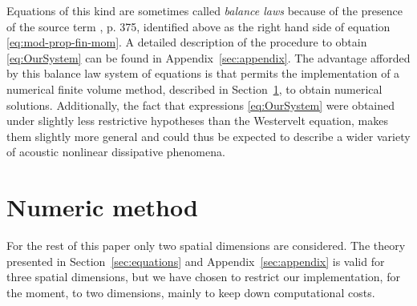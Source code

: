 Equations of this kind are sometimes called {\em balance laws} because of the presence of the source term \citep{leveque-book-fv}, p. 375, identified above as the right hand side of equation \eqref{eq:mod-prop-fin-mom}. 
A detailed description of the procedure to obtain \eqref{eq:OurSystem} can be found in Appendix~\ref{sec:appendix}. 
The advantage afforded by this balance law system of equations is that permits the implementation of a numerical finite volume method, described in Section~\ref{sec:numerical}, to obtain numerical solutions.
Additionally, the fact that expressions \eqref{eq:OurSystem} were obtained under slightly less restrictive hypotheses than the Westervelt equation, makes them slightly more general and could thus be expected to describe a wider variety of acoustic nonlinear dissipative phenomena.

\section{Numeric method}
\label{sec:numerical}

For the rest of this paper only two spatial dimensions are considered.  The theory presented in Section~\ref{sec:equations} and Appendix~\ref{sec:appendix} is valid for three spatial dimensions, but we have chosen to restrict our implementation, for the moment, to two dimensions, mainly to keep down computational costs.

